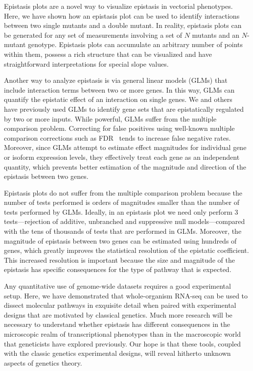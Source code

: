 Epistasis plots are a novel way to visualize epistasis in vectorial phenotypes.
Here, we have shown how an epistasis plot can be used to identify interactions
between two single mutants and a double mutant. In reality, epistasis plots
can be generated for any set of measurements involving a set of $N$ mutants and
an $N$-mutant genotype. Epistasis plots can accumulate an arbitrary number of
points within them, possess a rich structure that can be visualized and have
straightforward interpretations for special slope values.

Another way to analyze epistasis is via general linear models (GLMs) that include
interaction terms between two or more genes. In this way, GLMs can quantify
the epistatic effect of an interaction on single genes. We and
others~\citep{Dixit2016,Angeles-Albores2016a} have previously used GLMs to identify
gene sets that are epistatically regulated by two or more inputs. While powerful,
GLMs suffer from the multiple comparison problem. Correcting for false positives
using well-known multiple comparison corrections such as FDR~\citep{Storey2003}
tends to increase false negative rates.  Moreover, since GLMs attempt to estimate
effect magnitudes for individual gene or isoform expression levels, they
effectively treat each gene as an independent quantity, which prevents better
estimation of the magnitude and direction of the epistasis between two genes.

Epistasis plots do not suffer from the multiple comparison problem because the
number of tests performed is orders of magnitudes smaller than the number
of tests performed by GLMs. Ideally, in an epistasis plot we need only perform
3 tests---rejection of additive, unbranched and suppressive null models---compared
with the tens of thousands of tests that are performed in GLMs. Moreover, the
magnitude of epistasis between two genes can be estimated using hundreds of genes,
which greatly improves the statistical resolution of the epistatic coefficient.
This increased resolution is important because the size and magnitude of the
epistasis has specific consequences for the type of pathway that is expected.

Any quantitative use of genome-wide datasets requires a good experimental setup.
Here, we have demonstrated that whole-organism RNA-seq can be used to dissect
molecular pathways in exquisite detail when paired with experimental designs that
are motivated by classical genetics. Much more research will be necessary
to understand whether epistasis has different consequences in the microscopic
realm of transcriptional phenotypes than in the macroscopic world that geneticists
have explored previously. Our hope is that these tools, coupled with the classic
genetics experimental  designs, will reveal hitherto unknown aspects of genetics
theory.

